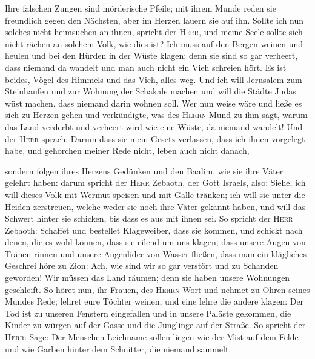  Ihre falschen Zungen sind mörderische Pfeile; mit ihrem
Munde reden sie freundlich gegen den Nächsten, aber im Herzen lauern sie
auf ihn.  Sollte ich nun solches nicht heimsuchen an
ihnen, spricht der \textsc{Herr}, und meine Seele sollte sich nicht
rächen an solchem Volk, wie dies ist?  Ich muss auf den
Bergen weinen und heulen und bei den Hürden in der Wüste klagen; denn
sie sind so gar verheert, dass niemand da wandelt und man auch nicht ein
Vieh schreien hört. Es ist beides, Vögel des Himmels und das Vieh, alles
weg.  Und ich will Jerusalem zum Steinhaufen und zur
Wohnung der Schakale machen und will die Städte Judas wüst machen, dass
niemand darin wohnen soll.  Wer nun weise wäre und ließe
es sich zu Herzen gehen und verkündigte, was des \textsc{Herrn} Mund zu
ihm sagt, warum das Land verderbt und verheert wird wie eine Wüste, da
niemand wandelt!  Und der \textsc{Herr} sprach: Darum
dass sie mein Gesetz verlassen, dass ich ihnen vorgelegt habe, und
gehorchen meiner Rede nicht, leben auch nicht danach,

 sondern folgen ihres Herzens Gedünken und den Baalim,
wie sie ihre Väter gelehrt haben:  darum spricht der
\textsc{Herr} Zebaoth, der Gott Israels, also: Siehe, ich will dieses
Volk mit Wermut speisen und mit Galle tränken;  ich will
sie unter die Heiden zerstreuen, welche weder sie noch ihre Väter
gekannt haben, und will das Schwert hinter sie schicken, bis dass es aus
mit ihnen sei.  So spricht der \textsc{Herr} Zebaoth:
Schaffet und bestellet Klageweiber, dass sie kommen, und schickt nach
denen, die es wohl können,  dass sie eilend um uns
klagen, dass unsere Augen von Tränen rinnen und unsere Augenlider von
Wasser fließen,  dass man ein klägliches Geschrei höre zu
Zion: Ach, wie sind wir so gar verstört und zu Schanden geworden! Wir
müssen das Land räumen; denn sie haben unsere Wohnungen geschleift.
 So höret nun, ihr Frauen, des \textsc{Herrn} Wort und
nehmet zu Ohren seines Mundes Rede; lehret eure Töchter weinen, und eine
lehre die andere klagen:  Der Tod ist zu unseren Fenstern
eingefallen und in unsere Paläste gekommen, die Kinder zu würgen auf der
Gasse und die Jünglinge auf der Straße.  So spricht der
\textsc{Herr}: Sage: Der Menschen Leichname sollen liegen wie der Mist
auf dem Felde und wie Garben hinter dem Schnitter, die niemand sammelt.

